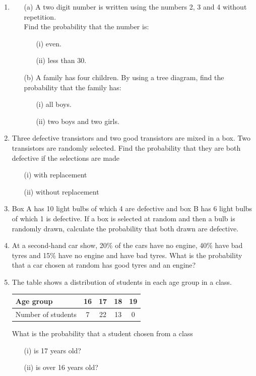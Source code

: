 \begin{enumerate}
	\item 
	\begin{itemize}
	\item[(a)] A two digit number is written using the numbers 2, 3 and 4 without repetition.\\
	\noindent Find the probability that the number is:
		\begin{itemize}
		\item[(i)] even.
		\item[(ii)] less than 30.
		\end{itemize}
	\item[(b)] A family has four children. By using a tree diagram, find the probability that the family has:
		\begin{itemize}
		\item[(i)] all boys.
		\item[(ii)] two boys and two girls.
		\end{itemize}
	\end{itemize}
	
	
	\item Three defective transistors and two good transistors are mixed in a box. Two transistors are randomly selected. Find the probability that they are both defective if the selections are made
	\begin{itemize}
	\item[(i)] with replacement
	\item[(ii)] without replacement
	\end{itemize}
	
	\item Box A has 10 light bulbs of which 4 are defective and box B has 6 light bulbs of which 1 is defective. If a box is selected at random and then a bulb is randomly drawn, calculate the probability that both drawn are defective.
	
	\item At a second-hand car show, 20\% of the cars have no engine, 40\% have bad tyres and 15\% have no engine and have bad tyres. What is the probability that a car chosen at random has good tyres and an engine?
	
	
	\item The table shows a distribution of students in each age group in a class.
	\begin{center}
	\begin{tabular}{|l|c|c|c|c|} \hline
	Age group & 16 & 17 & 18 & 19 \\ \hline
	Number of students & 7 & 22 & 13 & 0\\ \hline
	\end{tabular}
	\end{center}
	\noindent What is the probability that a student chosen from a class
	\begin{itemize}
	\item[(i)] is 17 years old?
	\item[(ii)] is over 16 years old?
	\end{itemize}
	

\end{enumerate}
